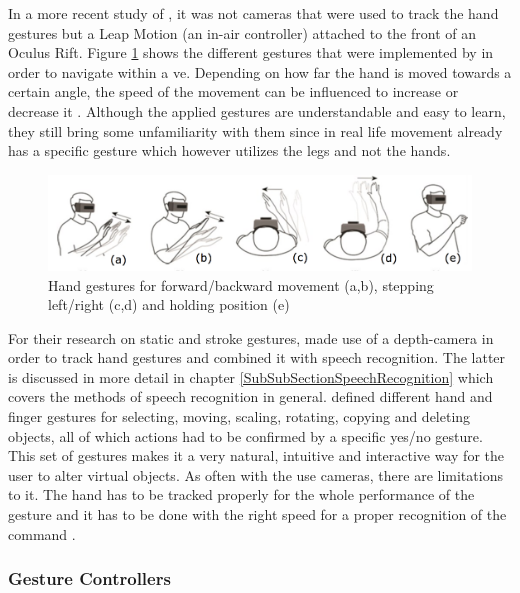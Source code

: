 In a more recent study of \cite{Khundam2015}, it was not cameras that were used to track the hand gestures but a Leap Motion (an in-air controller) attached to the front of an Oculus Rift. Figure \ref{fig:leapmotion} shows the different gestures that were implemented by \cite{Khundam2015} in order to navigate within a \gls{ve}. Depending on how far the hand is moved towards a certain angle, the speed of the movement can be influenced to increase or decrease it \citep{Khundam2015}. Although the applied gestures are understandable and easy to learn, they still bring some unfamiliarity with them since in real life movement already has a specific gesture which however utilizes the legs and not the hands.
\begin{figure}[h]
	\begin{center}
		\includegraphics[width=14cm]{03_Figures/05_LitReview/Khundam2015_LeapMotion.png}
		\caption[Hand gestures for forward/backward movement, stepping left/right and holding position]{Hand gestures for forward/backward movement (a,b), stepping left/right (c,d) and holding position (e) \citep{Khundam2015}}
		\label{fig:leapmotion}
	\end{center}
\end{figure}
\newline
For their research on static and stroke gestures, \cite{Chun2015} made use of a depth-camera in order to track hand gestures and combined it with speech recognition. The latter is discussed in more detail in chapter \ref{SubSubSectionSpeechRecognition} which covers the methods of speech recognition in general. \cite{Chun2015} defined different hand and finger gestures for selecting, moving, scaling, rotating, copying and deleting objects, all of which actions had to be confirmed by a specific yes/no gesture. This set of gestures makes it a very natural, intuitive and interactive way for the user to alter virtual objects. As often with the use cameras, there are limitations to it. The hand has to be tracked properly for the whole performance of the gesture and it has to be done with the right speed for a proper recognition of the command \citep{Chun2015}.


\subsubsection{Gesture Controllers}

